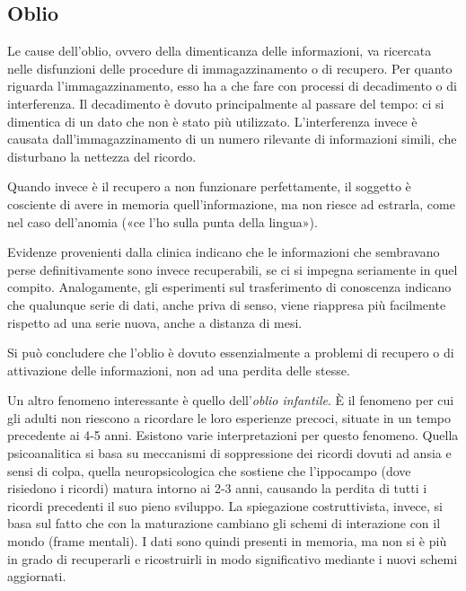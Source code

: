 \subsection{Oblio}
Le cause dell’oblio, ovvero della dimenticanza delle informazioni, va ricercata nelle disfunzioni delle procedure di immagazzinamento o di recupero. Per quanto riguarda l’immagazzinamento, esso ha a che fare con processi di decadimento o di interferenza. Il decadimento è dovuto principalmente al passare del tempo: ci si dimentica di un dato che non è stato più utilizzato. L’interferenza invece è causata dall’immagazzinamento di un numero rilevante di informazioni simili, che disturbano la nettezza del ricordo.

Quando invece è il recupero a non funzionare perfettamente, il soggetto è cosciente di avere in memoria quell’informazione, ma non riesce ad estrarla, come nel caso dell'anomia («ce l’ho sulla punta della lingua»).

Evidenze provenienti dalla clinica indicano che le informazioni che sembravano perse definitivamente sono invece recuperabili, se ci si impegna seriamente in quel compito. Analogamente, gli esperimenti sul trasferimento di conoscenza indicano che qualunque serie di dati, anche priva di senso, viene riappresa più facilmente rispetto ad una serie nuova, anche a distanza di mesi.

Si può concludere che l’oblio è dovuto essenzialmente a problemi di recupero o di attivazione delle informazioni, non ad una perdita delle stesse.

Un altro fenomeno interessante è quello dell’\emph{oblio infantile}. È il fenomeno per cui gli adulti non riescono a ricordare le loro esperienze precoci, situate in un tempo precedente ai 4-5 anni. Esistono varie interpretazioni per questo fenomeno. Quella psicoanalitica si basa su meccanismi di soppressione dei ricordi dovuti ad ansia e sensi di colpa, quella neuropsicologica che sostiene che l’ippocampo (dove risiedono i ricordi) matura intorno ai 2-3 anni, causando la perdita di tutti i ricordi precedenti il suo pieno sviluppo. La spiegazione costruttivista, invece, si basa sul fatto che con la maturazione cambiano gli schemi di interazione con il mondo (frame mentali). I dati sono quindi presenti in memoria, ma non si è più in grado di recuperarli e ricostruirli in modo significativo mediante i nuovi schemi aggiornati.

